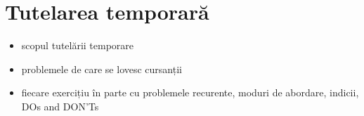 \chapter{Tutelarea temporară}

\begin{itemize}
\item scopul tutelării temporare
\item problemele de care se lovesc cursanții
\item fiecare exercițiu în parte cu problemele recurente, moduri de abordare,
        indicii, DOs and DON'Ts
\end{itemize}
